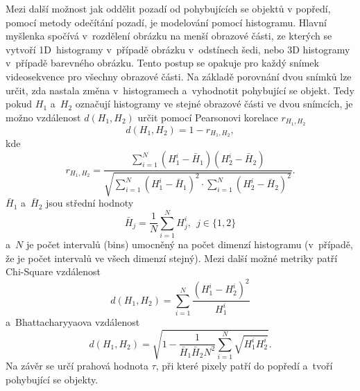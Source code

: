 \par{Mezi další možnost jak oddělit pozadí od pohybujících se objektů v popředí, pomocí metody odečítání pozadí, je modelování pomocí histogramu. Hlavní myšlenka spočívá v~rozdělení obrázku na menší obrazové části, ze kterých se vytvoří 1D~histogramy v~případě obrázku v~odstínech šedi, nebo 3D histogramy v~případě barevného obrázku. Tento postup se opakuje pro každý snímek videosekvence pro všechny obrazové části. Na základě porovnání dvou snímků lze určit, zda nastala změna v~histogramech a~vyhodnotit pohybující se objekt. Tedy pokud $H_1$ a~$H_2$ označují histogramy ve stejné obrazové části ve dvou snímcích, je možno vzdálenost $d \left( H_1, H_2 \right)$ určit pomocí Pearsonovi korelace $r_{H_1 , H_2}$
\begin{equation}
	d \left( H_1, H_2 \right) = 1 - r_{H_1 , H_2},
\end{equation}
kde
\begin{equation}
	r_{H_1 , H_2} = \frac{\sum\limits_{i = 1}^{N} \left( H_1^i - \bar{H}_1 \right) \left( H_2^i - \bar{H}_2 \right)}{\sqrt{\sum\limits_{i = 1}^{N} \left( H_1^i - \bar{H}_1 \right)^2 \cdot \sum\limits_{i = 1}^{N} \left( H_2^i - \bar{H}_2 \right)^2}}.
\end{equation}
$\bar{H}_1$ a~$\bar{H}_2$ jsou střední hodnoty
\begin{equation}
	\bar{H}_j = \frac{1}{N} \sum_{i = 1}^N H_j^i ,~~ j \in \{1,2 \}
\end{equation}
a~$N$ je počet intervalů (bins) umocněný na počet dimenzí histogramu (v~případě, že je počet intervalů ve všech dimenzí stejný). Mezi další možné metriky patří Chi-Square vzdálenost
\begin{equation}
	d \left( H_1, H_2 \right) = \sum\limits_{i = 1}^{N} \frac{ \left( H_1^i - H_2^i \right)^2}{H_1^i}
\end{equation}
a~Bhattacharyyaova vzdálenost
\begin{equation}
	d \left( H_1, H_2 \right) = \sqrt{1 - \frac{1}{\bar{H}_1 \bar{H}_2 N^2} \sum\limits_{i = 1}^{N} \sqrt{H_1^i H_2^i}}.
\end{equation}
Na závěr se určí prahová hodnota $\tau$, při které pixely patří do popředí a~tvoří pohybující se objekty.}










